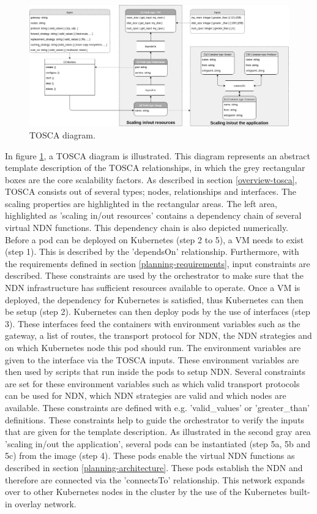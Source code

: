 \begin{figure}[H]
\centering
\includegraphics[width=\columnwidth]{Images/tosca-diagram.png}
\caption{TOSCA diagram.}
\label{fig:tosca-diagram}
\end{figure}

In figure \ref{fig:tosca-diagram}, a TOSCA diagram is illustrated. This diagram represents an abstract template description of the TOSCA relationships, in which the grey rectangular boxes are the core scalability factors. As described in section \ref{overview-tosca}, TOSCA consists out of several types; nodes, relationships and interfaces. The scaling properties are highlighted in the rectangular areas. The left area, highlighted as 'scaling in/out resources' contains a dependency chain of several virtual NDN functions. This dependency chain is also depicted numerically. Before a pod can be deployed on Kubernetes (step 2 to 5), a VM needs to exist (step 1). This is described by the 'dependsOn' relationship. Furthermore, with the requirements defined in section \ref{planning-requirements}, input constraints are described. These constraints are used by the orchestrator to make sure that the NDN infrastructure has sufficient resources available to operate. Once a VM is deployed, the dependency for Kubernetes is satisfied, thus Kubernetes can then be setup (step 2). Kubernetes can then deploy pods by the use of interfaces (step 3). These interfaces feed the containers with environment variables such as the gateway, a list of routes, the transport protocol for NDN, the NDN strategies and on which Kubernetes node this pod should run. The environment variables are given to the interface via the TOSCA inputs. These environment variables are then used by scripts that run inside the pods to setup NDN. Several constraints are set for these environment variables such as which valid transport protocols can be used for NDN, which NDN strategies are valid and which nodes are available. These constraints are defined with e.g. 'valid\_values' or 'greater\_than' definitions. These constraints help to guide the orchestrator to verify the inputs that are given for the template description. As illustrated in the second gray area 'scaling in/out the application', several pods can be instantiated (step 5a, 5b and 5c) from the image (step 4). These pods enable the virtual NDN functions as described in section \ref{planning-architecture}. These pods establish the NDN and therefore are connected via the 'connectsTo' relationship. This network expands over to other Kubernetes nodes in the cluster by the use of the Kubernetes built-in overlay network.

